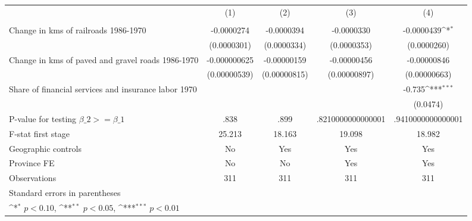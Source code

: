 {
\def\sym#1{\ifmmode^{#1}\else\(^{#1}\)\fi}
\begin{tabular}{l*{4}{c}}
\hline\hline
                &\multicolumn{1}{c}{(1)}&\multicolumn{1}{c}{(2)}&\multicolumn{1}{c}{(3)}&\multicolumn{1}{c}{(4)}\\
                &\multicolumn{1}{c}{}&\multicolumn{1}{c}{}&\multicolumn{1}{c}{}&\multicolumn{1}{c}{}\\
\hline
Change in kms of railroads 1986-1970&-0.0000274         &-0.0000394         &-0.0000330         &-0.0000439\sym{*}  \\
                &(0.0000301)         &(0.0000334)         &(0.0000353)         &(0.0000260)         \\
[1em]
Change in kms of paved and gravel roads 1986-1970&-0.000000625         &-0.00000159         &-0.00000456         &-0.00000846         \\
                &(0.00000539)         &(0.00000815)         &(0.00000897)         &(0.00000663)         \\
[1em]
Share of financial services and insurance labor 1970&                  &                  &                  &   -0.735\sym{***}\\
                &                  &                  &                  & (0.0474)         \\
\hline
P-value for testing $\beta\_{2} >= \beta\_{1}$&     .838         &     .899         &.8210000000000001         &.9410000000000001         \\
F-stat first stage&   25.213         &   18.163         &   19.098         &   18.982         \\
Geographic controls&       No         &      Yes         &      Yes         &      Yes         \\
Province FE     &       No         &       No         &      Yes         &      Yes         \\
Observations    &      311         &      311         &      311         &      311         \\
\hline\hline
\multicolumn{5}{l}{\footnotesize Standard errors in parentheses}\\
\multicolumn{5}{l}{\footnotesize \sym{*} \(p<0.10\), \sym{**} \(p<0.05\), \sym{***} \(p<0.01\)}\\
\end{tabular}
}
